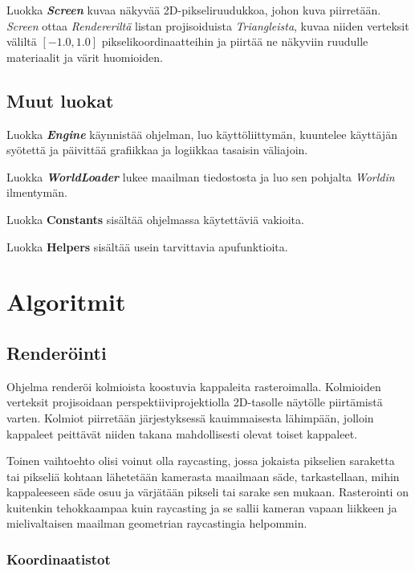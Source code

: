 \documentclass[12pt] {article}
\begin{document}
Luokka \textit{\textbf{Screen}} kuvaa näkyvää 2D-pikseliruudukkoa, johon kuva piirretään. \textit{Screen} ottaa \textit{Rendereriltä} listan projisoiduista \textit{Triangleista}, kuvaa niiden verteksit väliltä $[-1.0, 1.0]$ pikselikoordinaatteihin ja piirtää ne näkyviin ruudulle materiaalit ja värit huomioiden.

\subsection {Muut luokat}

Luokka \textit{\textbf{Engine}} käynnistää ohjelman, luo käyttöliittymän, kuuntelee käyttäjän syötettä ja päivittää grafiikkaa ja logiikkaa tasaisin väliajoin.

Luokka \textit{\textbf{WorldLoader}} lukee maailman tiedostosta ja luo sen pohjalta \textit{Worldin} ilmentymän.

Luokka \textbf{Constants} sisältää ohjelmassa käytettäviä vakioita.

Luokka \textbf{Helpers} sisältää usein tarvittavia apufunktioita.

\section {Algoritmit}

\subsection {Renderöinti}

Ohjelma renderöi kolmioista koostuvia kappaleita rasteroimalla. Kolmioiden verteksit projisoidaan perspektiiviprojektiolla 2D-tasolle näytölle piirtämistä varten. Kolmiot piirretään järjestyksessä kauimmaisesta lähimpään, jolloin kappaleet peittävät niiden takana mahdollisesti olevat toiset kappaleet.

Toinen vaihtoehto olisi voinut olla raycasting, jossa jokaista pikselien saraketta tai pikseliä kohtaan lähetetään kamerasta maailmaan säde, tarkastellaan, mihin kappaleeseen säde osuu ja värjätään pikseli tai sarake sen mukaan. Rasterointi on kuitenkin tehokkaampaa kuin raycasting ja se sallii kameran vapaan liikkeen ja mielivaltaisen maailman geometrian raycastingia helpommin.

\subsubsection {Koordinaatistot}
\end{document}
